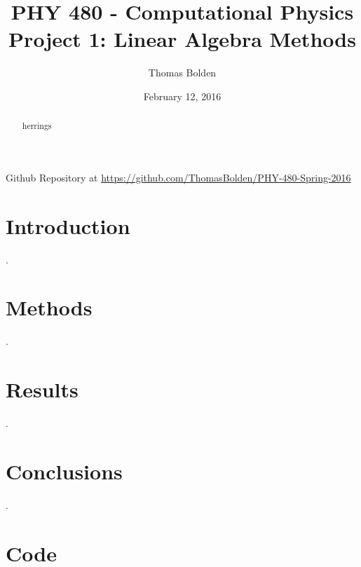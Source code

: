 \documentclass[11pt]{article}
\title{PHY 480 - Computational Physics \\ Project 1: Linear Algebra Methods}
\author{Thomas Bolden}
\date{February 12, 2016}
\begin{document}
\maketitle

\centerline{Github Repository at \href{https://github.com/ThomasBolden/PHY-480-Spring-2016}{https://github.com/ThomasBolden/PHY-480-Spring-2016}}

\begin{abstract}

    herrings

\end{abstract}

\vspace{\fill}
\tableofcontents

\pagebreak

\section{Introduction}

    .

\section{Methods}

    .

\section{Results}

    .

\section{Conclusions}

    .

\section{Code}

    

\begin{thebibliography}{1}


\end{thebibliography}
\end{document}
